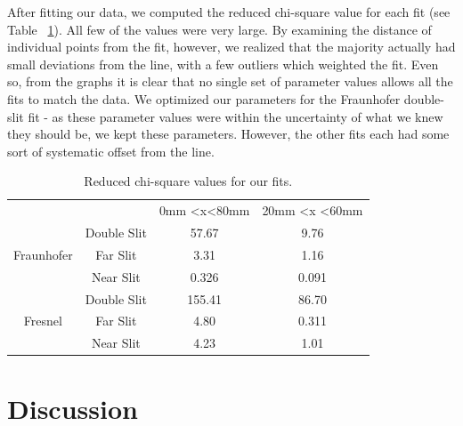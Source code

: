 \documentclass[prb,preprint]{revtex4-1}
\begin{document}
After fitting our data, we computed the reduced chi-square value for each fit (see Table ~\ref{chi-square}).  All few of the values were very large.  By examining the distance of individual points from the fit, however, we realized that the majority actually had small deviations from the line, with a few outliers which weighted the fit.  Even so, from the graphs it is clear that no single set of parameter values allows all the fits to match the data.  We optimized our parameters for the Fraunhofer double-slit fit - as these parameter values were within the uncertainty of what we knew they should be, we kept these parameters.  However, the other fits each had some sort of systematic offset from the line.  

\begin{table}[h!]
\centering
\caption{Reduced chi-square values for our fits. }
\begin{ruledtabular}
\begin{tabular}{cccc}
                            &             & 0mm \textless x\textless 80mm & 20mm \textless x \textless 60mm \\
\multirow{3}{*}{Fraunhofer} & Double Slit &57.67                      & 9.76                         \\
                            & Far Slit    & 3.31                       & 1.16                        \\
                            & Near Slit   & 0.326                       &        0.091           \\
\multirow{3}{*}{Fresnel}    & Double Slit &          155.41               & 86.70                         \\
                            & Far Slit    & 4.80                       & 0.311                         \\
                            & Near Slit   & 4.23                       &1.01                       
\end{tabular}
\end{ruledtabular}
\label{chi-square}
\end{table}


\section{Discussion}
\end{document}
